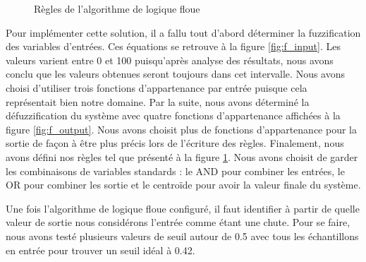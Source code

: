 \documentclass[12pt,letterpaper]{article}
\begin{document}
\begin{figure}
    \quad

    \caption{Règles de l'algorithme de logique floue}
    \label{fig:f_rule}
\end{figure}

Pour implémenter cette solution, il a fallu tout d'abord déterminer la fuzzification des variables d'entrées. Ces équations
se retrouve à la figure \ref{fig:f_input}. Les valeurs varient entre 0 et 100 puisqu'après analyse des résultats, nous avons conclu que les valeurs obtenues seront toujours dans cet intervalle. Nous avons choisi d'utiliser trois fonctions d'appartenance par entrée puisque cela représentait bien notre domaine. Par la suite, nous avons déterminé la défuzzification du système avec quatre fonctions d'appartenance affichées à la figure \ref{fig:f_output}. Nous avons choisit plus de fonctions d'appartenance pour la sortie de façon à être plus précis lors de l'écriture des règles. Finalement, nous avons défini nos règles tel que présenté à la figure \ref{fig:f_rule}. Nous avons choisit de garder les combinaisons de variables standards : le AND pour combiner les entrées, le OR pour combiner les sortie et le centroïde pour avoir la valeur finale du système.

Une fois l'algorithme de logique floue configuré, il faut identifier à partir de quelle valeur de sortie nous considérons l'entrée comme étant une chute. Pour se faire, nous avons testé plusieurs valeurs de seuil autour de 0.5 avec tous les échantillons en entrée pour trouver un seuil idéal à 0.42.
\end{document}
